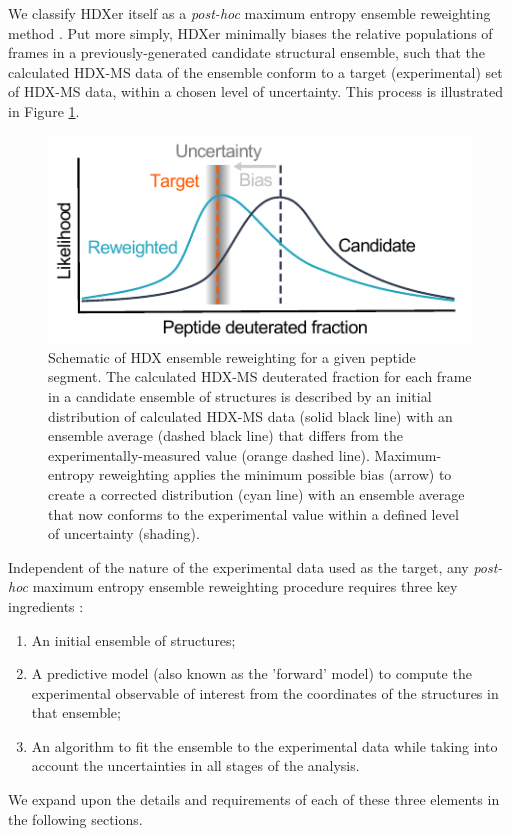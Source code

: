 \documentclass[9pt,tutorial,ASAPversion]{livecoms}
\begin{document}
We classify HDXer itself as a \textit{post-hoc} maximum entropy ensemble reweighting method \cite{Pitera2012, Boomsma2014}. 
Put more simply, HDXer minimally biases the relative populations of frames in a previously-generated candidate structural ensemble, such that the calculated HDX-MS data of the ensemble conform to a target (experimental) set of HDX-MS data, within a chosen level of uncertainty.
This process is illustrated in Figure \ref{fig:reweightingschematic}.
\begin{figure}
    \includegraphics[width=0.98\linewidth]{Fig1_HDXer_schematic_v5.pdf}
    \caption{Schematic of HDX ensemble reweighting for a given peptide segment. The calculated HDX-MS deuterated fraction for each frame in a candidate ensemble of structures is described by an initial distribution of calculated HDX-MS data (solid black line) with an ensemble average (dashed black line) that differs from the experimentally-measured value (orange dashed line). Maximum-entropy reweighting applies the minimum possible bias (arrow) to create a corrected distribution (cyan line) with an ensemble average that now conforms to the experimental value within a defined level of uncertainty (shading).}
    \label{fig:reweightingschematic}
\end{figure}

Independent of the nature of the experimental data used as the target, any \textit{post-hoc} maximum entropy ensemble reweighting procedure requires three key ingredients \cite{Orioli2020}:

\begin{enumerate}
\item An initial ensemble of structures;
\item A predictive model (also known as the 'forward' model) to compute the experimental observable of interest from the coordinates of the structures in that ensemble;
\item An algorithm to fit the ensemble to the experimental data while taking into account the uncertainties in all stages of the analysis. 
\end{enumerate}
We expand upon the details and requirements of each of these three elements in the following sections.
\end{document}
